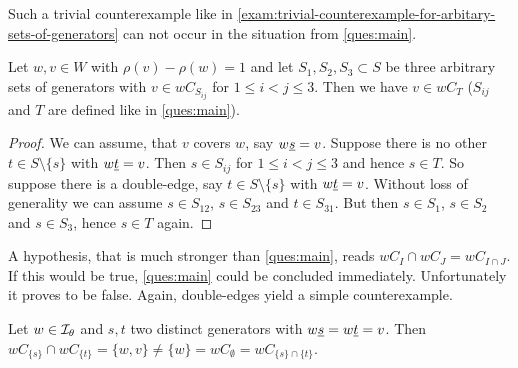 Such a trivial counterexample like in \ref{exam:trivial-counterexample-for-arbitary-sets-of-generators} can not occur in the situation from \ref{ques:main}.

\begin{prop}
	Let $w,v \in W$ with $\rho(v) - \rho(w) = 1$ and let $S_1,S_2,S_3 \subset S$ be three arbitrary sets of generators with $v \in w C_{S_{ij}}$ for $1 \leq i < j \leq 3$. Then we have $v \in wC_T$ ($S_{ij}$ and $T$ are defined like in \ref{ques:main}).

	\begin{proof}
		We can assume, that $v$ covers $w$, say $w \underline{s} = v$. Suppose there is no other $t \in S \setminus \{s\}$ with $w \underline{t} = v$. Then $s \in S_{ij}$ for $1 \leq i < j \leq 3$ and hence $s \in T$. So suppose there is a double-edge, say $t \in S \setminus \{s\}$ with $w \underline{t} = v$. Without loss of generality we can assume $s \in S_{12}$, $s \in S_{23}$ and $t \in S_{31}$. But then $s \in S_1$, $s \in S_2$ and $s \in S_3$, hence $s \in T$ again.
	\end{proof}
\end{prop}

%
%		

A hypothesis, that is much stronger than \ref{ques:main}, reads $wC_I \cap wC_J = wC_{I \cap J}$. If this would be true, \ref{ques:main} could be concluded immediately. Unfortunately it proves to be false. Again, double-edges yield a simple counterexample.

\begin{exam}
	Let $w \in \mathcal{I}_{\theta}$ and $s,t$ two distinct generators with $w \underline{s} = w \underline{t} = v$. Then $wC_{\{s\}} \cap wC_{\{t\}} = \{w,v\} \neq \{w\} = wC_{\emptyset} = wC_{\{s\} \cap \{t\}}$.
\end{exam}

